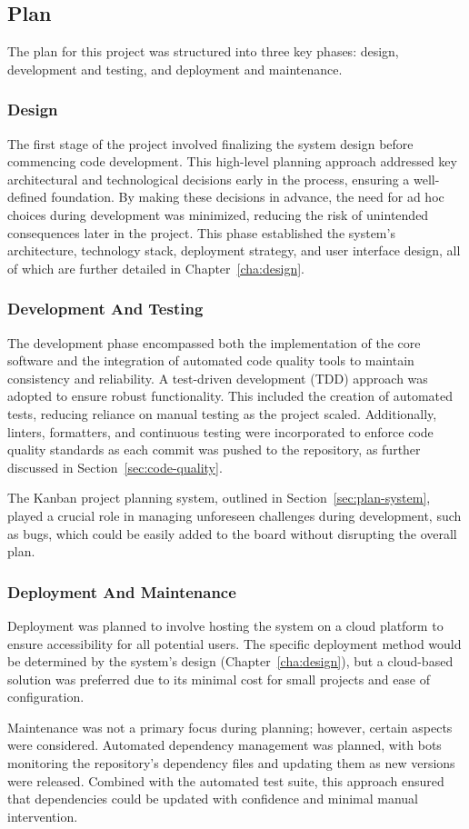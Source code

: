\subsection{Plan}
The plan for this project was structured into three key phases: design, development and testing, and deployment and maintenance.

\subsubsection{Design}
The first stage of the project involved finalizing the system design before commencing code development. This high-level planning approach addressed key architectural and technological decisions early in the process, ensuring a well-defined foundation. By making these decisions in advance, the need for ad hoc choices during development was minimized, reducing the risk of unintended consequences later in the project. This phase established the system's architecture, technology stack, deployment strategy, and user interface design, all of which are further detailed in Chapter~\ref{cha:design}.

\subsubsection{Development And Testing}
The development phase encompassed both the implementation of the core software and the integration of automated code quality tools to maintain consistency and reliability. A test-driven development (TDD) approach was adopted to ensure robust functionality. This included the creation of automated tests, reducing reliance on manual testing as the project scaled. Additionally, linters, formatters, and continuous testing were incorporated to enforce code quality standards as each commit was pushed to the repository, as further discussed in Section~\ref{sec:code-quality}.

The Kanban project planning system, outlined in Section~\ref{sec:plan-system}, played a crucial role in managing unforeseen challenges during development, such as bugs, which could be easily added to the board without disrupting the overall plan.

\subsubsection{Deployment And Maintenance}
Deployment was planned to involve hosting the system on a cloud platform to ensure accessibility for all potential users. The specific deployment method would be determined by the system’s design (Chapter~\ref{cha:design}), but a cloud-based solution was preferred due to its minimal cost for small projects and ease of configuration.

Maintenance was not a primary focus during planning; however, certain aspects were considered. Automated dependency management was planned, with bots monitoring the repository’s dependency files and updating them as new versions were released. Combined with the automated test suite, this approach ensured that dependencies could be updated with confidence and minimal manual intervention.

